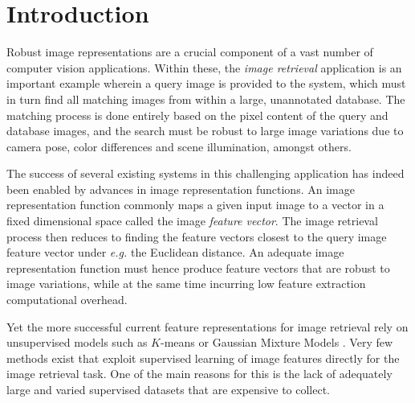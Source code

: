 \section{Introduction}

Robust image representations are a crucial component of a vast number of computer vision applications. Within these, the \emph{image retrieval} application is an important example wherein a query image is provided to the system, which must in turn find all matching images from within a large, unannotated database. The matching process is done entirely based on the pixel content of the query and database images, and the search must be robust to large image variations due to camera pose, color differences and scene illumination, amongst others.

The success of several existing systems in this challenging application has indeed been enabled by advances in  image representation functions. An image representation function commonly maps a given input image to a vector in a fixed dimensional space called the image \emph{feature vector}. The image retrieval process then reduces to finding the feature vectors closest to the query image feature vector under \textit{e.g.} the Euclidean distance. An adequate image representation function must hence produce feature vectors that are robust to image variations, while at the same time incurring low feature extraction computational overhead.


Yet the more successful current feature representations for image retrieval rely on unsupervised models such as $K$-means \cite{Delhumeau2013} or Gaussian Mixture Models \cite{Perronnin2010}. Very few methods \cite{Arandjelovic15,Rana,Bilen2015} exist that exploit supervised learning of image features directly for the image retrieval task. One of the main reasons for this is the lack of adequately large and varied supervised datasets that are expensive to collect.


